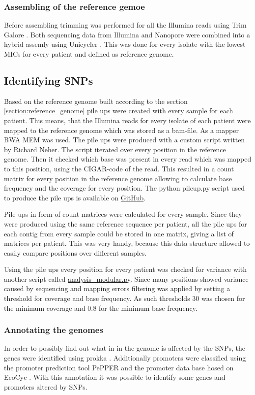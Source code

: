 \subsubsection{Assembling of the reference gemoe}
Before assembling trimming was performed for all the Illumina reads using Trim Galore \cite{trim_galore}.
Both sequencing data from Illumina and Nanopore were combined into a hybrid assemly using Unicycler \cite{unicycler}. This was done for every isolate with the lowest MICs for every patient and defined as reference genome.

\subsection{Identifying SNPs}
Based on the reference genome built according to the section \ref{section:reference_genome} pile ups were created with every sample for each patient. This means, that the Illumina reads for every isolate of each patient were mapped to the reference genome which was stored as a bam-file. As a mapper 
BWA MEM \cite{bwa_mem} was used. 
The pile ups were produced with a custom script written by Richard Neher.
The script iterated over every position in the reference genome. Then it checked which base was present in every read which was mapped to this position, using the CIGAR-code of the read. This resulted in a count matrix for every position in the reference genome allowing to calculate base frequency and the coverage for every position. The python pileup.py script used to produce the pile ups is available on \href{https://github.com/nahanoo/ESBL\_project/pileup.py}{GitHub}.

Pile ups in form of count matrices were calculated for every sample. Since they were produced using the same reference sequence per patient, all the pile ups for each contig from every sample could be stored in one matrix, giving a list of matrices per patient. This was very handy, because this data structure allowed to easily compare positions over different samples.

Using the pile ups every position for every patient was checked for variance with another script called \href{https://github.com/nahanoo/ESBL\_project/pileup.py}{analysis\_modular.py}. Since many positions showed variance caused by sequencing and mapping errors filtering was applied by setting a threshold for coverage and base frequency. As such thresholds 30 was chosen for the minimum coverage and 0.8 for the minimum base frequency. 

\subsubsection{Annotating the genomes}
In order to possibly find out what in in the genome is affected by the SNPs, the genes were identified using prokka \cite{prokka}. Additionally promoters were classified using the promoter prediction tool PePPER \cite{pepper} and the promoter data base hosed on EcoCyc \cite{ecocyc}. With this annotation it was possible to identify some genes and promoters altered by SNPs.

